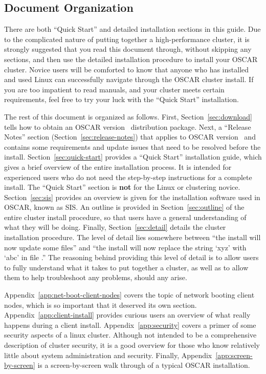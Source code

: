 
\subsection{Document Organization}

There are both ``Quick Start'' and detailed installation sections in
this guide. Due to the complicated nature of putting together a
high-performance cluster, it is strongly suggested that you read this
document through, without skipping any sections, and then use the
detailed installation procedure to install your OSCAR cluster.  Novice
users will be comforted to know that anyone who has installed and used
Linux can successfully navigate through the OSCAR cluster install.  If
you are too impatient to read manuals, and your cluster meets certain
requirements, feel free to try your luck with the ``Quick Start''
installation.

The rest of this document is organized as follows.  
%
First, Section~\ref{sec:download} tells how to obtain an OSCAR version
\oscarversion\ distribution package.
%
Next, a ``Release Notes'' section (Section~\ref{sec:release-notes})
that applies to OSCAR version \oscarversion\ and contains some
requirements and update issues that need to be resolved before the
install.
%
Section~\ref{sec:quick-start} provides a ``Quick Start'' installation
guide, which gives a brief overview of the entire installation
process.  It is intended for experienced users who do not need the
step-by-step instructions for a complete install.  The ``Quick Start''
section is {\bf not} for the Linux or clustering novice.
%
Section~\ref{sec:sis} provides an overview is given for the
installation software used in OSCAR, known as SIS.  
%
An outline is provided in Section~\ref{sec:outline} of the entire
cluster install procedure, so that users have a general understanding
of what they will be doing.
%
Finally, Section~\ref{sec:detail} details the cluster installation
procedure.  The level of detail lies somewhere between ``the install
will now update some files'' and ``the install will now replace the
string `xyz' with `abc' in file .'' The reasoning
behind providing this level of detail is to allow users to fully
understand what it takes to put together a cluster, as well as to
allow them to help troubleshoot any problems, should any arise.

Appendix~\ref{app:net-boot-client-nodes} covers the topic of network
booting client nodes, which is so important that it deserved its own
section.  
%
Appendix~\ref{app:client-install} provides curious users an overview
of what really happens during a client install.
%
Appendix~\ref{app:security} covers a primer of some security aspects
of a linux cluster.  Although not intended to be a comprehensive
description of cluster security, it is a good overview for those who
know relatively little about system administration and security.
%
Finally, Appendix~\ref{app:screen-by-screen} is a screen-by-screen
walk through of a typical OSCAR installation.

